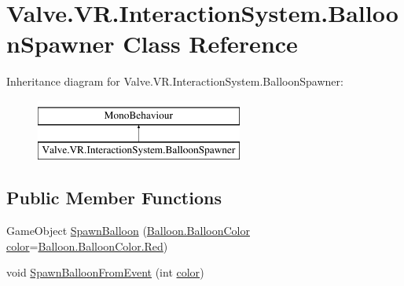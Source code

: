 \hypertarget{class_valve_1_1_v_r_1_1_interaction_system_1_1_balloon_spawner}{}\section{Valve.\+V\+R.\+Interaction\+System.\+Balloon\+Spawner Class Reference}
\label{class_valve_1_1_v_r_1_1_interaction_system_1_1_balloon_spawner}
Inheritance diagram for Valve.\+V\+R.\+Interaction\+System.\+Balloon\+Spawner\+:\begin{figure}[H]
\begin{center}
\leavevmode
\includegraphics[height=2.000000cm]{class_valve_1_1_v_r_1_1_interaction_system_1_1_balloon_spawner}
\end{center}
\end{figure}
\subsection*{Public Member Functions}
\begin{DoxyCompactItemize}
\item 
Game\+Object \mbox{\hyperlink{class_valve_1_1_v_r_1_1_interaction_system_1_1_balloon_spawner_a379c702dbcb8ee4a91968cdc0fe7a4a0}{Spawn\+Balloon}} (\mbox{\hyperlink{class_valve_1_1_v_r_1_1_interaction_system_1_1_balloon_afa934082ca64404919e75be87f823175}{Balloon.\+Balloon\+Color}} \mbox{\hyperlink{class_valve_1_1_v_r_1_1_interaction_system_1_1_balloon_spawner_a14a4ee7bbbfe9c8d11c802fee3a8fb89}{color}}=\mbox{\hyperlink{class_valve_1_1_v_r_1_1_interaction_system_1_1_balloon_afa934082ca64404919e75be87f823175aee38e4d5dd68c4e440825018d549cb47}{Balloon.\+Balloon\+Color.\+Red}})
\item 
void \mbox{\hyperlink{class_valve_1_1_v_r_1_1_interaction_system_1_1_balloon_spawner_a9605abaeb16a1fdec2e15cd2a1c75916}{Spawn\+Balloon\+From\+Event}} (int \mbox{\hyperlink{class_valve_1_1_v_r_1_1_interaction_system_1_1_balloon_spawner_a14a4ee7bbbfe9c8d11c802fee3a8fb89}{color}})
\end{DoxyCompactItemize}
